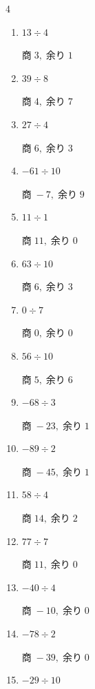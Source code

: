 \begin{multicols}{4}
\begin{enumerate}
        $商\; 5,\; 余り\; 1$

  \item $13 \div 4$

        $商\; 3,\; 余り\; 1$

  \item $39 \div 8$

        $商\; 4,\; 余り\; 7$

  \item $27 \div 4$

        $商\; 6,\; 余り\; 3$

  \item $-61 \div 10$

        $商\; -7,\; 余り\; 9$

  \item $11 \div 1$

        $商\; 11,\; 余り\; 0$

  \item $63 \div 10$

        $商\; 6,\; 余り\; 3$

  \item $0 \div 7$

        $商\; 0,\; 余り\; 0$

  \item $56 \div 10$

        $商\; 5,\; 余り\; 6$

  \item $-68 \div 3$

        $商\; -23,\; 余り\; 1$

  \item $-89 \div 2$

        $商\; -45,\; 余り\; 1$

\columnbreak %

  \item $58 \div 4$

        $商\; 14,\; 余り\; 2$

  \item $77 \div 7$

        $商\; 11,\; 余り\; 0$

  \item $-40 \div 4$

        $商\; -10,\; 余り\; 0$

  \item $-78 \div 2$

        $商\; -39,\; 余り\; 0$

  \item $-29 \div 10$


\end{enumerate}
\end{multicols}
